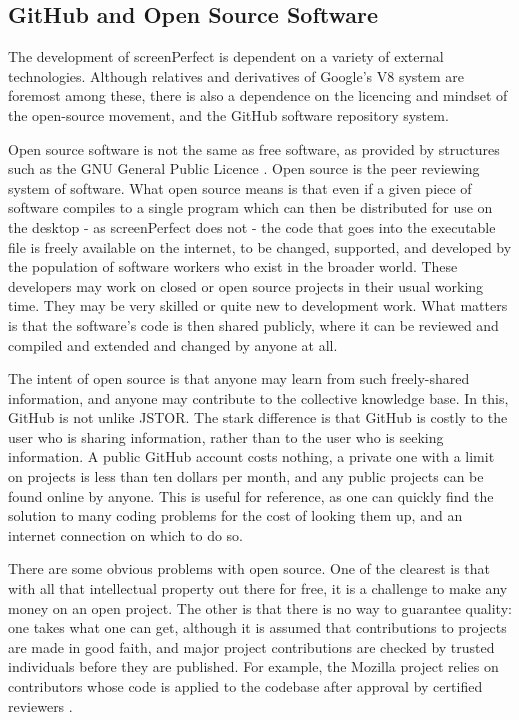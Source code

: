 \subsection{GitHub and Open Source Software}
The development of screenPerfect is dependent on a variety of external technologies. Although relatives and derivatives of Google's V8 system are foremost among these, there is also a dependence on the licencing and mindset of the open-source movement, and the GitHub software repository system.

Open source software is not the same as free software, as provided by structures such as the GNU General Public Licence . Open source is the peer reviewing system of software. What open source means is that even if a given piece of software compiles to a single program which can then be distributed for use on the desktop - as screenPerfect does not - the code that goes into the executable file is freely available on the internet, to be changed, supported, and developed by the population of software workers who exist in the broader world. These developers may work on closed or open source projects in their usual working time. They may be very skilled or quite new to development work. What matters is that the software's code is then shared publicly, where it can be reviewed and compiled and extended and changed by anyone at all.

The intent of open source is that anyone may learn from such freely-shared information, and anyone may contribute to the collective knowledge base. In this, GitHub is not unlike JSTOR. The stark difference is that GitHub is costly to the user who is sharing information, rather than to the user who is seeking information. A public GitHub account costs nothing, a private one with a limit on projects is less than ten dollars per month, and any public projects can be found online by anyone. This is useful for reference, as one can quickly find the solution to many coding problems for the cost of looking them up, and an internet connection on which to do so.

There are some obvious problems with open source. One of the clearest is that with all that intellectual property out there for free, it is a challenge to make any money on an open project. The other is that there is no way to guarantee quality: one takes what one can get, although it is assumed that contributions to projects are made in good faith, and major project contributions are checked by trusted individuals before they are published. For example, the Mozilla project relies on contributors whose code is applied to the codebase after approval by certified reviewers \cite[URL]{mozillacontribute}. 

